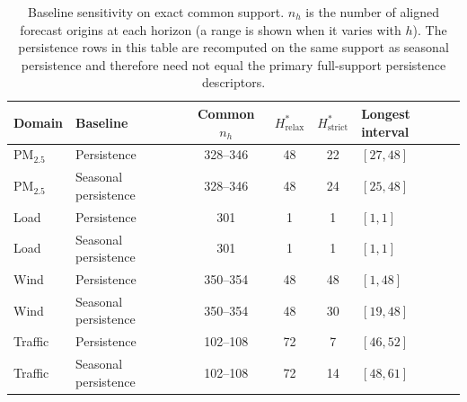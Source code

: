\begin{table}[t]
\centering
\small
\setlength{\tabcolsep}{4pt}
\begin{tabular}{@{}llcccl@{}}
\toprule
Domain & Baseline & Common $n_h$ & $H^*_{\mathrm{relax}}$ & $H^*_{\mathrm{strict}}$ & Longest interval \\
\midrule
PM$_{2.5}$ & Persistence & 328--346 & 48 & 22 & $[27,48]$ \\
PM$_{2.5}$ & Seasonal persistence & 328--346 & 48 & 24 & $[25,48]$ \\
\addlinespace[2pt]
Load & Persistence & 301 & 1 & 1 & $[1,1]$ \\
Load & Seasonal persistence & 301 & 1 & 1 & $[1,1]$ \\
\addlinespace[2pt]
Wind & Persistence & 350--354 & 48 & 48 & $[1,48]$ \\
Wind & Seasonal persistence & 350--354 & 48 & 30 & $[19,48]$ \\
\addlinespace[2pt]
Traffic & Persistence & 102--108 & 72 & 7 & $[46,52]$ \\
Traffic & Seasonal persistence & 102--108 & 72 & 14 & $[48,61]$ \\
\bottomrule
\end{tabular}
\caption{Baseline sensitivity on exact common support. $n_h$ is the number of aligned forecast origins at each horizon (a range is shown when it varies with $h$). The persistence rows in this table are recomputed on the same support as seasonal persistence and therefore need not equal the primary full-support persistence descriptors.}
\label{tab:baseline-sensitivity}
\end{table}
